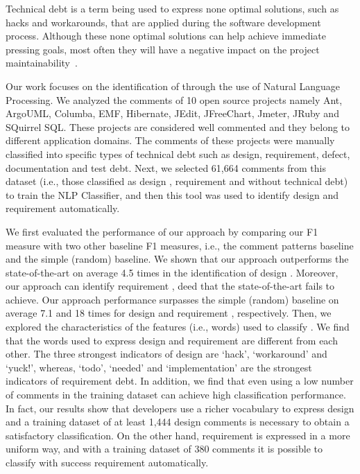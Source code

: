 Technical debt is a term being used to express none optimal solutions, such as hacks and workarounds, that are applied during the software development process. Although these none optimal solutions can help achieve immediate pressing goals, most often they will have a negative impact on the project maintainability~\cite{Zazworka2011MTD}. 

Our work focuses on the identification of \SATD through the use of Natural Language Processing. We analyzed the comments of 10 open source projects namely Ant, ArgoUML, Columba, EMF, Hibernate, JEdit, JFreeChart, Jmeter, JRuby and SQuirrel SQL. These projects are considered well commented and they belong to different application domains. The comments of these projects were manually classified into specific types of technical debt such as design, requirement, defect, documentation and test debt. Next, we selected 61,664 comments from this dataset (i.e., those classified as design \SATD, requirement \SATD and without technical debt) to train the NLP Classifier, and then this tool was used to identify  design and requirement \SATD automatically.

We first evaluated the performance of our approach by comparing our F1 measure with two other baseline F1 measures, i.e., the comment patterns baseline and the simple (random) baseline. We shown that our approach outperforms the state-of-the-art on average 4.5 times in the identification of design \SATD. Moreover, our approach can identify requirement \SATD, deed that the state-of-the-art fails to achieve. Our approach performance surpasses the simple (random) baseline on average 7.1 and 18 times for design and requirement \SATD, respectively. Then, we explored the characteristics of the features (i.e., words) used to classify \SATD. We find that the words used to express design and requirement \SATD are different from each other. The three strongest indicators of design \SATD are `hack', `workaround' and `yuck!', whereas, `todo', `needed' and `implementation' are the strongest indicators of requirement debt. In addition, we find that even using a low number of \SATD comments in the training dataset can achieve high classification performance. In fact, our results show that developers use a richer vocabulary to express design \SATD and a training dataset of at least 1,444 design \SATD comments is necessary to obtain a satisfactory classification. On the other hand, requirement \SATD is expressed in a more uniform way, and with a training dataset of 380 \SATD comments it is possible to classify with success requirement \SATD automatically.

